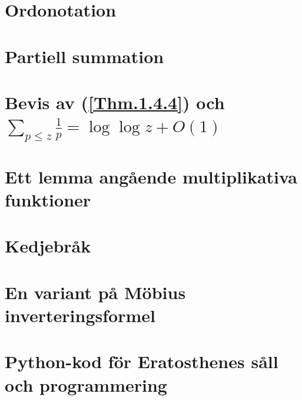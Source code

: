 \documentclass[a4paper]{article}
\begin{document}

\newpage
\printbibliography

\medskip

\newpage
\appendix
\section{Ordonotation} \label{APDX:Ordo}
 
\section{Partiell summation}
\section{Bevis av (\ref{Thm.1.4.4}) och \(\sum_{p \leq z} \frac{1}{p} = \log \log z + O(1)\)}
\section{Ett lemma angående multiplikativa funktioner}

\section{Kedjebråk}
 \label{APDX:cfrac}
\section{En variant på Möbius inverteringsformel}

\section{Python-kod för Eratosthenes såll och programmering}

\end{document}

